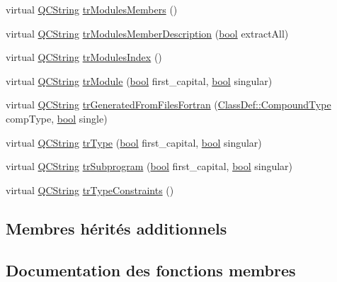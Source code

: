 \begin{DoxyCompactItemize}
\item 
virtual \hyperlink{class_q_c_string}{Q\+C\+String} \hyperlink{class_translator_finnish_a60dbf6ec84b76df710f225bce1e35094}{tr\+Modules\+Members} ()
\item 
virtual \hyperlink{class_q_c_string}{Q\+C\+String} \hyperlink{class_translator_finnish_a6009c0371fbab4cd9ec84e79e253a12c}{tr\+Modules\+Member\+Description} (\hyperlink{qglobal_8h_a1062901a7428fdd9c7f180f5e01ea056}{bool} extract\+All)
\item 
virtual \hyperlink{class_q_c_string}{Q\+C\+String} \hyperlink{class_translator_finnish_a42136e396650775295b61be476699775}{tr\+Modules\+Index} ()
\item 
virtual \hyperlink{class_q_c_string}{Q\+C\+String} \hyperlink{class_translator_finnish_a791ef864c70e989c64be70902fb1ed4d}{tr\+Module} (\hyperlink{qglobal_8h_a1062901a7428fdd9c7f180f5e01ea056}{bool} first\+\_\+capital, \hyperlink{qglobal_8h_a1062901a7428fdd9c7f180f5e01ea056}{bool} singular)
\item 
virtual \hyperlink{class_q_c_string}{Q\+C\+String} \hyperlink{class_translator_finnish_a93d2ec3af6d922013852869ebda85c55}{tr\+Generated\+From\+Files\+Fortran} (\hyperlink{class_class_def_ae70cf86d35fe954a94c566fbcfc87939}{Class\+Def\+::\+Compound\+Type} comp\+Type, \hyperlink{qglobal_8h_a1062901a7428fdd9c7f180f5e01ea056}{bool} single)
\item 
virtual \hyperlink{class_q_c_string}{Q\+C\+String} \hyperlink{class_translator_finnish_aee57cf3efd22a5f62b99b4f9d5903d97}{tr\+Type} (\hyperlink{qglobal_8h_a1062901a7428fdd9c7f180f5e01ea056}{bool} first\+\_\+capital, \hyperlink{qglobal_8h_a1062901a7428fdd9c7f180f5e01ea056}{bool} singular)
\item 
virtual \hyperlink{class_q_c_string}{Q\+C\+String} \hyperlink{class_translator_finnish_a20f2ab991746e266355f9954382fb52b}{tr\+Subprogram} (\hyperlink{qglobal_8h_a1062901a7428fdd9c7f180f5e01ea056}{bool} first\+\_\+capital, \hyperlink{qglobal_8h_a1062901a7428fdd9c7f180f5e01ea056}{bool} singular)
\item 
virtual \hyperlink{class_q_c_string}{Q\+C\+String} \hyperlink{class_translator_finnish_aaabc8d5dc3dd12146e72ae8dbe4f3025}{tr\+Type\+Constraints} ()
\end{DoxyCompactItemize}
\subsection*{Membres hérités additionnels}


\subsection{Documentation des fonctions membres}
\hypertarget{class_translator_finnish_a406d2dd6193f6e7a5baa24f64b2259b2}{}
